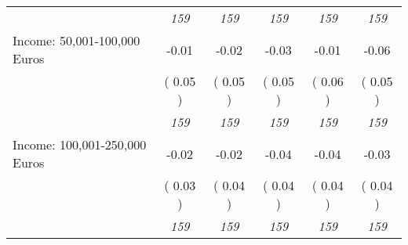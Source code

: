 \begin{tabular}{l c c c c c}
& \textit{ 159 } & \textit{ 159 } & \textit{ 159 } & \textit{ 159 } & \textit{ 159 } \\
Income: 50,001-100,000 Euros &     -0.01 &     -0.02 &     -0.03 &     -0.01 &     -0.06 \\
& (     0.05 ) & (     0.05 ) & (     0.05 ) & (     0.06 ) & (     0.05 ) \\
& \textit{ 159 } & \textit{ 159 } & \textit{ 159 } & \textit{ 159 } & \textit{ 159 } \\
Income: 100,001-250,000 Euros &     -0.02 &     -0.02 &     -0.04 &     -0.04 &     -0.03 \\
& (     0.03 ) & (     0.04 ) & (     0.04 ) & (     0.04 ) & (     0.04 ) \\
& \textit{ 159 } & \textit{ 159 } & \textit{ 159 } & \textit{ 159 } & \textit{ 159 } \\
\bottomrule
\end{tabular}
